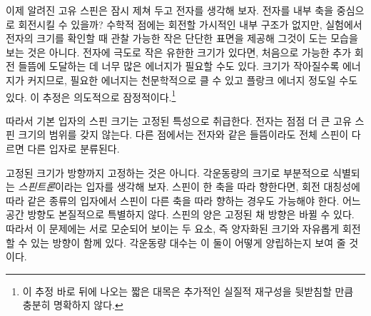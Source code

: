 이제 알려진 고유 스핀은 잠시 제쳐 두고 전자를 생각해 보자. 전자를 내부 축을 중심으로 회전시킬 수 있을까? 수학적 점에는 회전할 가시적인 내부 구조가 없지만, 실험에서 전자의 크기를 확인할 때 관찰 가능한 작은 단단한 표면을 제공해 그것이 도는 모습을 보는 것은 아니다. 전자에 극도로 작은 유한한 크기가 있다면, 처음으로 가능한 추가 회전 들뜸에 도달하는 데 너무 많은 에너지가 필요할 수도 있다. 크기가 작아질수록 에너지가 커지므로, 필요한 에너지는 천문학적으로 클 수 있고 플랑크 에너지 정도일 수도 있다. 이 추정은 의도적으로 잠정적이다.\footnote{이 추정 바로 뒤에 나오는 짧은 대목은 추가적인 실질적 재구성을 뒷받침할 만큼 충분히 명확하지 않다.}

따라서 기본 입자의 스핀 크기는 고정된 특성으로 취급한다. 전자는 점점 더 큰 고유 스핀 크기의 범위를 갖지 않는다. 다른 점에서는 전자와 같은 들뜸이라도 전체 스핀이 다르면 다른 입자로 분류된다.

고정된 크기가 방향까지 고정하는 것은 아니다. 각운동량의 크기로 부분적으로 식별되는 \emph{스핀트론}이라는 입자를 생각해 보자. 스핀이 한 축을 따라 향한다면, 회전 대칭성에 따라 같은 종류의 입자에서 스핀이 다른 축을 따라 향하는 경우도 가능해야 한다. 어느 공간 방향도 본질적으로 특별하지 않다. 스핀의 양은 고정된 채 방향은 바뀔 수 있다. 따라서 이 문제에는 서로 모순되어 보이는 두 요소, 즉 양자화된 크기와 자유롭게 회전할 수 있는 방향이 함께 있다. 각운동량 대수는 이 둘이 어떻게 양립하는지 보여 줄 것이다.

\begin{classroomqa}\end{classroomqa}

